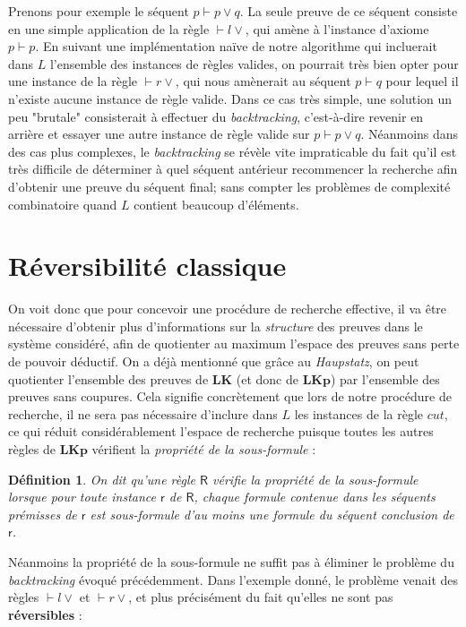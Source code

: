 \documentclass[12pt]{report}
\newcommand{\seq}{\vdash}
\newcommand{\irule}[1]{\footnotesize$#1$}
\newcommand{\iruleR}[1]{\irule{\seq{#1}}}
\newtheorem{definition}{Définition}
\begin{document}
Prenons pour exemple le séquent $p \seq p \lor q$. La seule preuve de ce séquent consiste en une simple application de la règle {\iruleR{l\lor}}, qui amène à l'instance d'axiome $p \seq p$. En suivant une implémentation naïve de notre algorithme qui incluerait dans $L$ l'ensemble des instances de règles valides, on pourrait très bien opter pour une instance de la règle {\iruleR{r\lor}}, qui nous amènerait au séquent $p \seq q$ pour lequel il n'existe aucune instance de règle valide. Dans ce cas très simple, une solution un peu "brutale" consisterait à effectuer du \emph{backtracking}, c'est-à-dire revenir en arrière et essayer une autre instance de règle valide sur $p \seq p \lor q$. Néanmoins dans des cas plus complexes, le \emph{backtracking} se révèle vite impraticable du fait qu'il est très difficile de déterminer à quel séquent antérieur recommencer la recherche afin d'obtenir une preuve du séquent final; sans compter les problèmes de complexité combinatoire quand $L$ contient beaucoup d'éléments.

\chapter*{Réversibilité classique}

On voit donc que pour concevoir une procédure de recherche effective, il va être nécessaire d'obtenir plus d'informations sur la \emph{structure} des preuves dans le système considéré, afin de quotienter au maximum l'espace des preuves sans perte de pouvoir déductif. On a déjà mentionné que grâce au \emph{Haupstatz}, on peut quotienter l'ensemble des preuves de $\mathbf{LK}$ (et donc de $\mathbf{LKp}$) par l'ensemble des preuves sans coupures. Cela signifie concrètement que lors de notre procédure de recherche, il ne sera pas nécessaire d'inclure dans $L$ les instances de la règle $cut$, ce qui réduit considérablement l'espace de recherche puisque toutes les autres règles de $\mathbf{LKp}$ vérifient la \emph{propriété de la sous-formule} :

\begin{definition}
    On dit qu'une règle $\mathsf{R}$ vérifie la \emph{propriété de la sous-formule} lorsque pour toute instance $\mathsf{r}$ de $\mathsf{R}$, chaque formule contenue dans les séquents prémisses de $\mathsf{r}$ est sous-formule d'au moins une formule du séquent conclusion de $\mathsf{r}$.
\end{definition}

Néanmoins la propriété de la sous-formule ne suffit pas à éliminer le problème du \emph{backtracking} évoqué précédemment. Dans l'exemple donné, le problème venait des règles {\iruleR{l\lor}} et {\iruleR{r\lor}}, et plus précisément du fait qu'elles ne sont pas \textbf{réversibles} :
\end{document}
